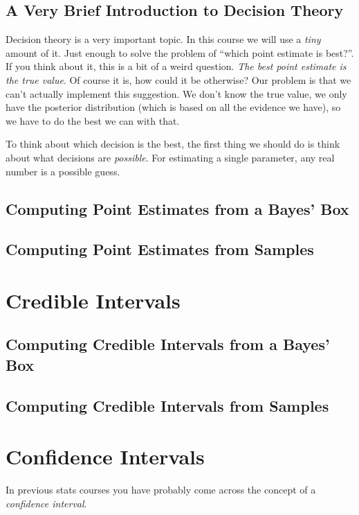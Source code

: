 \subsection{A Very Brief Introduction to Decision Theory}
Decision theory is a very important topic. In this course we will use a
{\it tiny} amount of it. Just enough to solve the problem of ``which point
estimate is best?''. If you think about it, this is a bit of a weird question.
{\it The best point estimate is the true value}. Of course it is, how could it
be otherwise? Our problem is that we can't actually implement this suggestion.
We don't know the true value, we only have the posterior distribution
(which is based on all the evidence we have), so we have to do 
the best we can with that.

To think about which decision is the best, the first thing we should do is think
about what decisions are {\it possible}. For estimating a single parameter, any
real number is a possible guess.






\subsection{Computing Point Estimates from a Bayes' Box}


\subsection{Computing Point Estimates from Samples}





\section{Credible Intervals}

\subsection{Computing Credible Intervals from a Bayes' Box}


\subsection{Computing Credible Intervals from Samples}


\section{Confidence Intervals}
In previous stats courses you have probably come across the concept of a
{\it confidence interval}.

